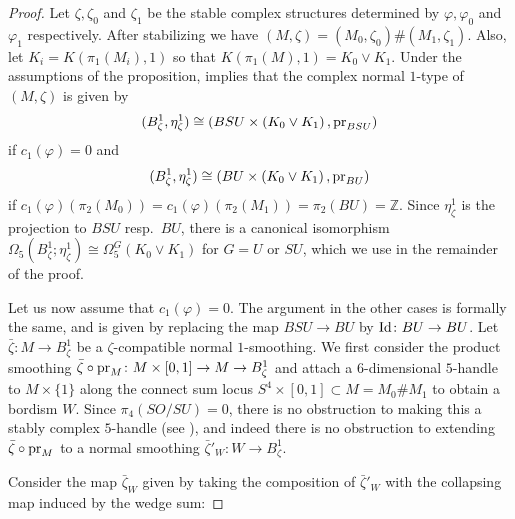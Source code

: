\documentclass[12pt]{amsart}
\newcommand\acs{\varphi}  				%
\newcommand\scxs{\zeta}					%
\newcommand\bscxs{\bar \zeta}			%
\theoremstyle{remark}
\begin{document}
\begin{proof}
Let $\scxs, \scxs_0$ and $\scxs_1$ be the stable complex structures determined by $\acs, \acs_0$
and $\acs_1$ respectively.  After stabilizing we have $(M, \scxs) = (M_0, \scxs_0) \# (M_1, \scxs_1)$.
Also, let $K_i = K(\pi_1(M_i), 1)$ so that $K(\pi_1(M), 1) = K_0 \vee K_1$.
Under the assumptions of the proposition, \cite[Lemma~2.13]{BCS2} implies that the complex normal
$1$-type of $(M, \scxs)$ is given by
%
\[ 
(B^1_\scxs, \eta^1_\scxs) \cong (BSU \times 
\left( K_0 \vee K_1 \right), 
{\rm pr}_{BSU}) 
\]
%
if $c_1(\acs) = 0$ and
%
\[ 
(B^1_\scxs, \eta^1_\scxs) \cong (BU \times 
\left( K_0 \vee K_1 \right), 
{\rm pr}_{BU}) 
\]
if $c_1(\acs)(\pi_2(M_0)) =c_1(\acs)(\pi_2(M_1))= \pi_2(BU)  = \mathbb{Z}$. 
Since $\eta^1_\scxs$ is the projection to $BSU$
resp.\ $BU$, there is a canonical isomorphism 
$\Omega_5(B^1_\zeta; \eta^1_\zeta) \cong \Omega_5^G(K_0 \vee K_1)$ for $G = U$ or $SU$,
which we use in the remainder of the proof.

Let us now assume that $c_1(\acs) = 0$.
The argument in the other cases is formally the same, and is given by replacing
the map $BSU \to BU$ by ${\rm Id} \colon BU \to BU$. %
Let $\bscxs \colon M \to B^1_\scxs$ be a $\scxs$-compatible normal $1$-smoothing.
We first consider the product smoothing 
$\bscxs \circ {\rm pr}_M \colon M \times [0, 1] \to M \to B^1_\scxs$ and attach
a 6-dimensional $5$-handle to $M \times \{1\}$ along the connect sum locus
$S^4 \times [0, 1] \subset M = M_0 \# M_1$ to obtain a bordism $W$.  
Since $\pi_4(SO/SU) = 0$, there is
no obstruction to making this a stably complex $5$-handle (see \cite[Section 2.3]{BCS2}),
and indeed there is no obstruction to extending $\bscxs \circ {\rm pr}_M$ to a normal smoothing
$\bscxs'_{W} \colon W \to B^1_\scxs$.

Consider the map $\bscxs_W$ given by taking the composition
of $\bscxs'_{W}$ with the collapsing map induced by the
wedge sum:


\end{proof}
\end{document}
